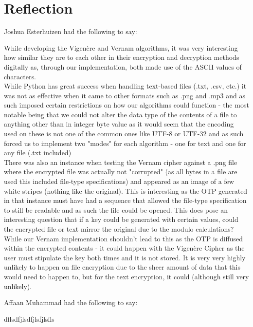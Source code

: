 \documentclass[a4paper, 12pt, titlepage]{report}
\begin{document}
\section{Reflection}
Joshua Esterhuizen had the following to say:
\begin{displayquote}
While developing the Vigenère and Vernam algorithms, it was very interesting how similar they are to each other in their encryption and decryption methods digitally as, through our implementation, both made use of the ASCII values of characters.
\\
While Python has great success when handling text-based files (.txt, .csv, etc.) it was not as effective when it came to other formats such as .png and .mp3 and as such imposed certain restrictions on how our algorithms could function - the most notable being that we could not alter the data type of the contents of a file to anything other than in integer byte value as it would seem that the encoding used on these is not one of the common ones like UTF-8 or UTF-32 and as such forced us to implement two "modes" for each algorithm - one for text and one for any file (.txt included)
\\
There was also an instance when testing the Vernam cipher against a .png file where the encrypted file was actually not "corrupted" (as all bytes in a file are used this included file-type specifications) and appeared as an image of a few white stripes (nothing like the original). This is interesting as the OTP generated in that instance must have had a sequence that allowed the file-type specification to still be readable and as such the file could be opened. This does pose an interesting question that if a key could be generated with certain values, could the encrypted file or text mirror the original due to the modulo calculations? While our Vernam implementation shouldn't lead to this as the OTP is diffused within the encrypted contents - it could happen with the Vigenère Cipher as the user must stipulate the key both times and it is not stored. It is very very highly unlikely to happen on file encryption due to the sheer amount of data that this would need to happen to, but for the text encryption, it could (although still very unlikely).
\end{displayquote}
Affaan Muhammad had the following to say:
\begin{displayquote}
dflsdfjlsdfjlsfjlsfls
\end{displayquote}
\end{document}
